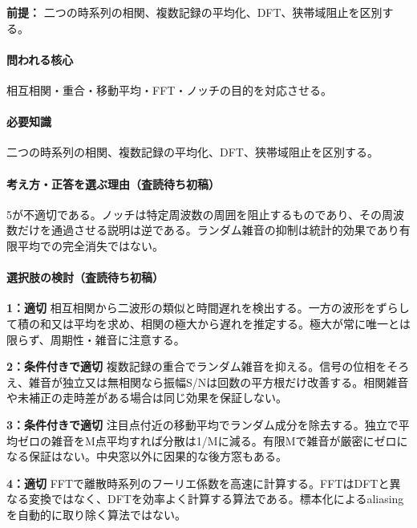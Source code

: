 \noindent\textbf{前提：} 二つの時系列の相関、複数記録の平均化、DFT、狭帯域阻止を区別する。\par

\paragraph{問われる核心} 相互相関・重合・移動平均・FFT・ノッチの目的を対応させる。

\paragraph{必要知識} 二つの時系列の相関、複数記録の平均化、DFT、狭帯域阻止を区別する。

\paragraph{考え方・正答を選ぶ理由（査読待ち初稿）} 5が不適切である。ノッチは特定周波数の周囲を阻止するものであり、その周波数だけを通過させる説明は逆である。ランダム雑音の抑制は統計的効果であり有限平均での完全消失ではない。

\paragraph{選択肢の検討（査読待ち初稿）}\mbox{}\par

\noindent\textbf{1：適切} 相互相関から二波形の類似と時間遅れを検出する。一方の波形をずらして積の和又は平均を求め、相関の極大から遅れを推定する。極大が常に唯一とは限らず、周期性・雑音に注意する。\par

\noindent\textbf{2：条件付きで適切} 複数記録の重合でランダム雑音を抑える。信号の位相をそろえ、雑音が独立又は無相関なら振幅S/Nは回数の平方根だけ改善する。相関雑音や未補正の走時差がある場合は同じ効果を保証しない。\par

\noindent\textbf{3：条件付きで適切} 注目点付近の移動平均でランダム成分を除去する。独立で平均ゼロの雑音をM点平均すれば分散は1/Mに減る。有限Mで雑音が厳密にゼロになる保証はない。中央窓以外に因果的な後方窓もある。\par

\noindent\textbf{4：適切} FFTで離散時系列のフーリエ係数を高速に計算する。FFTはDFTと異なる変換ではなく、DFTを効率よく計算する算法である。標本化によるaliasingを自動的に取り除く算法ではない。\par

